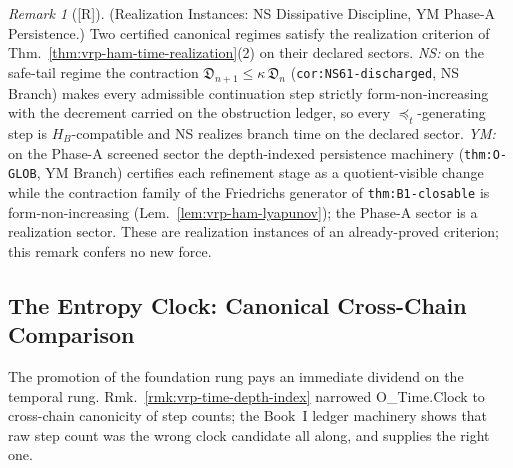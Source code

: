 \documentclass[12pt,oneside]{amsbook}
\theoremstyle{plain}
\theoremstyle{definition}
\theoremstyle{remark}
\newtheorem{remark}[theorem]{Remark}
\newcommand{\status}[1]{\textup{[#1]}}
\begin{document}
\begin{remark}[\status{R}]\label{rmk:vrp-ham-time-instances}
\textup{(Realization Instances: NS Dissipative Discipline, YM
Phase-A Persistence.)}
Two certified canonical regimes satisfy the realization criterion
of Thm.~\ref{thm:vrp-ham-time-realization}(2) on their declared
sectors.  \emph{NS:} on the safe-tail regime the contraction
$\mathfrak{D}_{n+1} \le \kappa\,\mathfrak{D}_n$
(\texttt{cor:NS61-discharged}, NS Branch) makes every admissible
continuation step strictly form-non-increasing with the decrement
carried on the obstruction ledger, so every $\preceq_t$-generating
step is $H_B$-compatible and NS realizes branch time on the
declared sector.  \emph{YM:} on the Phase-A screened sector the
depth-indexed persistence machinery
(\texttt{thm:O-GLOB}, YM Branch) certifies each refinement stage
as a quotient-visible change while the contraction family of the
Friedrichs generator of \texttt{thm:B1-closable} is
form-non-increasing (Lem.~\ref{lem:vrp-ham-lyapunov}); the
Phase-A sector is a realization sector.  These are realization
instances of an already-proved criterion; this remark confers no
new force.
\end{remark}

\subsection{The Entropy Clock: Canonical Cross-Chain Comparison}
\label{sec:vrp-entropy-clock}

The promotion of the foundation rung pays an immediate dividend on
the temporal rung.  Rmk.~\ref{rmk:vrp-time-depth-index} narrowed
O\_Time.Clock to cross-chain canonicity of step counts; the Book~I
ledger machinery shows that raw step count was the wrong clock
candidate all along, and supplies the right one.
\end{document}
